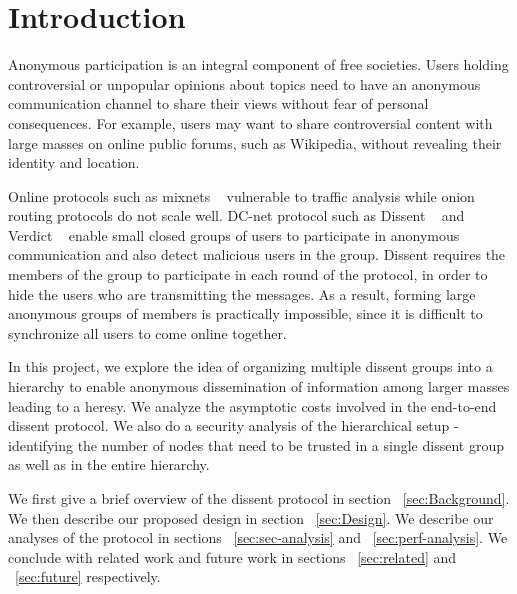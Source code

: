 \section{Introduction}

Anonymous participation is an integral component of free societies. Users holding controversial or unpopular opinions about topics need to have an anonymous communication channel to share their views without fear of personal consequences. For example, users may want to share controversial content with large masses on online public forums, such as Wikipedia, without revealing their identity and location.

Online protocols such as mixnets ~\cite{chaum-dc,chaum-mix} vulnerable to traffic analysis while onion routing protocols do not scale well. DC-net protocol such as Dissent ~\cite{dissent} and Verdict ~\cite{verdict} enable small closed groups of users to participate in anonymous communication and also detect malicious users in the group. Dissent requires the members of the group to participate in each round of the protocol, in order to hide the users who are transmitting the messages. As a result, forming large anonymous groups of members is practically impossible, since it is difficult to synchronize all users to come online together.

In this project, we explore the idea of organizing multiple dissent groups into a hierarchy to enable anonymous dissemination of information among larger masses leading to a heresy. We analyze the asymptotic costs involved in the end-to-end dissent protocol. We also do a security analysis of the hierarchical setup - identifying the number of nodes that need to be trusted in a single dissent group as well as in the entire hierarchy.

We first give a brief overview of the dissent protocol in section ~\ref{sec:Background}. We then describe our proposed design in section ~\ref{sec:Design}. We describe our analyses of the protocol in sections ~\ref{sec:sec-analysis} and ~\ref{sec:perf-analysis}. We conclude with related work and future work in sections ~\ref{sec:related} and ~\ref{sec:future} respectively.

